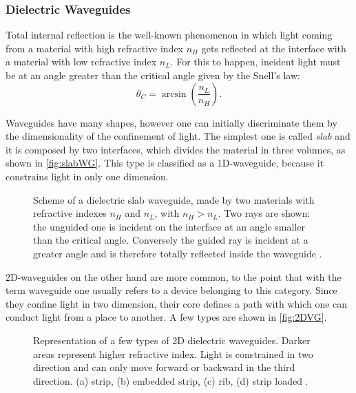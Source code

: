 \subsubsection{Dielectric Waveguides}
\label{sssec:Dielectric_Waveguides}
Total internal reflection is the well-known phenomenon in which light coming from a material with high refractive index $n_H$ gets reflected at the interface with a material with low refractive index $n_L$.
For this to happen, incident light must be at an angle greater than the critical angle given by the Snell's law:
\begin{equation*}
	\theta_C = \arcsin \left( \dfrac{n_L}{n_H}\right).
\end{equation*}

Waveguides have many shapes, however one can initially discriminate them by the dimensionality of the confinement of light.
The simplest one is called \textit{slab} and it is composed by two interfaces, which divides the material in three volumes, as shown in \autoref{fig:slabWG}.
This type is classified as a 1D-waveguide, because it constrains light in only one dimension.

\begin{figure}[ht]
	\centering
	
	\caption{Scheme of a dielectric slab waveguide, made by two materials with refractive indexes $n_H$ and $n_L$, with $n_H>n_L$.
		Two rays are shown: the unguided one is incident on the interface at an angle smaller than the critical angle.
		Conversely the guided ray is incident at a greater angle and is therefore totally reflected inside the waveguide \cite{Saleh1991}.}
	\label{fig:slabWG}
\end{figure}

2D-waveguides on the other hand are more common, to the point that with the term waveguide one usually refers to a device belonging to this category.
Since they confine light in two dimension, their core defines a path with which one can conduct light from a place to another.
A few types are shown in \autoref{fig:2DVG}.

\begin{figure}[ht]
	\centering
	
	\caption{Representation of a few types of 2D dielectric waveguides.
		Darker areas represent higher refractive index.
		Light is constrained in two direction and can only move forward or backward in the third direction.
		(a) strip, (b) embedded strip, (c) rib, (d) strip loaded \cite{Saleh1991}.
		}
	\label{fig:2DVG}
\end{figure}

